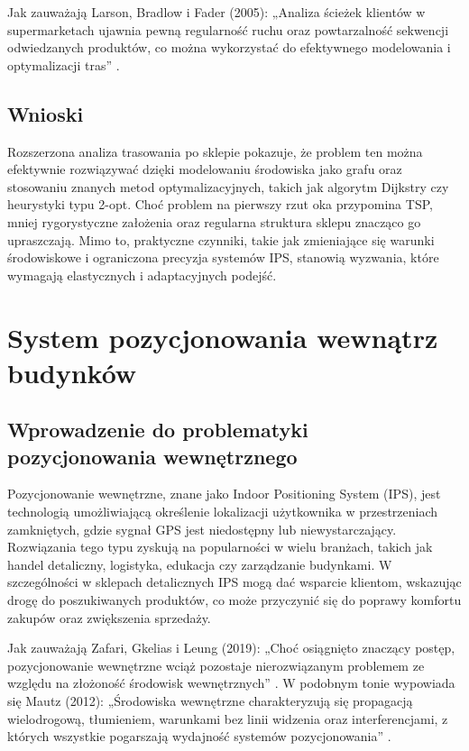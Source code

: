 Jak zauważają Larson, Bradlow i Fader (2005): „Analiza ścieżek klientów w supermarketach ujawnia pewną regularność ruchu oraz powtarzalność sekwencji odwiedzanych produktów, co można wykorzystać do efektywnego modelowania i optymalizacji tras” \cite{Larson2005}.

\subsection{Wnioski}
Rozszerzona analiza trasowania po sklepie pokazuje, że problem ten można efektywnie rozwiązywać dzięki modelowaniu środowiska jako grafu oraz stosowaniu znanych metod optymalizacyjnych, takich jak algorytm Dijkstry czy heurystyki typu 2-opt. Choć problem na pierwszy rzut oka przypomina TSP, mniej rygorystyczne założenia oraz regularna struktura sklepu znacząco go upraszczają. Mimo to, praktyczne czynniki, takie jak zmieniające się warunki środowiskowe i ograniczona precyzja systemów IPS, stanowią wyzwania, które wymagają elastycznych i adaptacyjnych podejść.

\section{System pozycjonowania wewnątrz budynków}

\subsection{Wprowadzenie do problematyki pozycjonowania wewnętrznego}
Pozycjonowanie wewnętrzne, znane jako Indoor Positioning System (IPS), jest technologią umożliwiającą określenie lokalizacji użytkownika w przestrzeniach zamkniętych, gdzie sygnał GPS jest niedostępny lub niewystarczający. Rozwiązania tego typu zyskują na popularności w wielu branżach, takich jak handel detaliczny, logistyka, edukacja czy zarządzanie budynkami. W szczególności w sklepach detalicznych IPS mogą dać wsparcie klientom, wskazując drogę do poszukiwanych produktów, co może przyczynić się do poprawy komfortu zakupów oraz zwiększenia sprzedaży.

Jak zauważają Zafari, Gkelias i Leung (2019): „Choć osiągnięto znaczący postęp, pozycjonowanie wewnętrzne wciąż pozostaje nierozwiązanym problemem ze względu na złożoność środowisk wewnętrznych” \cite{Zafari2019}. W podobnym tonie wypowiada się Mautz (2012): „Środowiska wewnętrzne charakteryzują się propagacją wielodrogową, tłumieniem, warunkami bez linii widzenia oraz interferencjami, z których wszystkie pogarszają wydajność systemów pozycjonowania” \cite{Mautz2012}.

